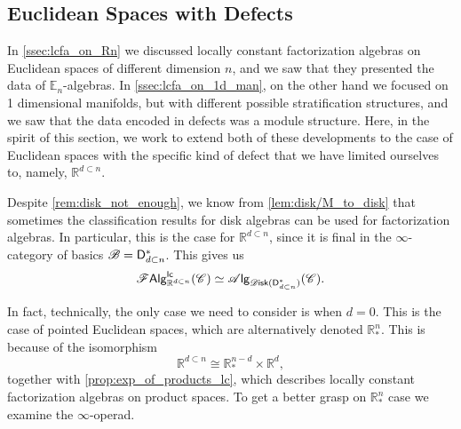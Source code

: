 \documentclass[../text]{subfiles}
\begin{document}
\subsection{Euclidean Spaces with Defects}


In \cref{ssec:lcfa_on_Rn} we discussed locally constant factorization algebras on Euclidean spaces of different dimension $n$, and we saw that they presented the data of $\mathbb{E}_n$-algebras. In \cref{ssec:lcfa_on_1d_man}, on the other hand we focused on 1 dimensional manifolds, but with different possible stratification structures, and we saw that the data encoded in defects was a module structure. Here, in the spirit of this section, we work to extend both of these developments to the case of Euclidean spaces with the specific kind of defect that we have limited ourselves to, namely, $\mathbb{R}^{d \subset n}$.

Despite \cref{rem:disk_not_enough}, we know from \cref{lem:disk/M_to_disk} that sometimes the classification results for disk algebras can be used for factorization algebras. In particular, this is the case for $\mathbb{R}^{d \subset n}$, since it is final in the $\infty$-category of basics $\mathscr{B} = \mathsf{D}_{d \subset n}^*$. This gives us
%
\begin{equation}\label{eq:focus_on_disk_dn}
    \lcfa_{\mathbb{R}^{d \subset n}} (\catC) \simeq \alg{\disk (\mathsf{D}_{d \subset n}^*)} (\catC).
\end{equation}

In fact, technically, the only case we need to consider is when $d=0$. This is the case of pointed Euclidean spaces, which are alternatively denoted $\mathbb{R}^n_*$. This is because of the isomorphism
%
\begin{equation}
    \mathbb{R}^{d \subset n} \cong \mathbb{R}^{n-d}_* \times \mathbb{R}^d,
\end{equation}
%
together with \cref{prop:exp_of_products_lc}, which describes locally constant factorization algebras on product spaces. To get a better grasp on $\mathbb{R}^n_*$ case we examine the $\infty$-operad.
\end{document}
